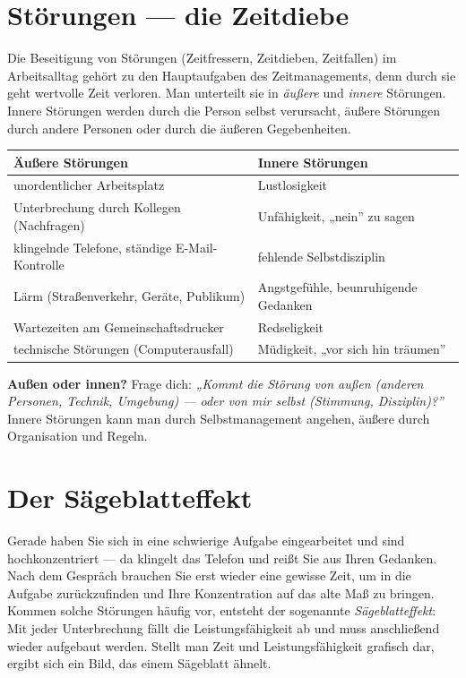 \documentclass[11pt, a4paper]{article}
\begin{document}
\section{Störungen --- die Zeitdiebe}

Die Beseitigung von Störungen (Zeitfressern, Zeitdieben, Zeitfallen) im Arbeitsalltag
gehört zu den Hauptaufgaben des Zeitmanagements, denn durch sie geht wertvolle Zeit
verloren. Man unterteilt sie in \emph{äußere} und \emph{innere} Störungen. Innere
Störungen werden durch die Person selbst verursacht, äußere Störungen durch andere
Personen oder durch die äußeren Gegebenheiten.

\begin{center}
\begin{tabular}{p{6.4cm} p{6.4cm}}
\toprule
\textbf{Äußere Störungen} & \textbf{Innere Störungen}\\
\midrule
unordentlicher Arbeitsplatz & Lustlosigkeit\\
Unterbrechung durch Kollegen (Nachfragen) & Unfähigkeit, „nein” zu sagen\\
klingelnde Telefone, ständige E-Mail-Kontrolle & fehlende Selbstdisziplin\\
Lärm (Straßenverkehr, Geräte, Publikum) & Angstgefühle, beunruhigende Gedanken\\
Wartezeiten am Gemeinschaftsdrucker & Redseligkeit\\
technische Störungen (Computerausfall) & Müdigkeit, „vor sich hin träumen”\\
\bottomrule
\end{tabular}
\end{center}

\begin{eselsbruecke}
\textbf{Außen oder innen?} Frage dich: \emph{„Kommt die Störung von außen (anderen
Personen, Technik, Umgebung) --- oder von mir selbst (Stimmung, Disziplin)?”} Innere
Störungen kann man durch Selbstmanagement angehen, äußere durch Organisation und Regeln.
\end{eselsbruecke}

\section{Der Sägeblatteffekt}

Gerade haben Sie sich in eine schwierige Aufgabe eingearbeitet und sind hochkonzentriert
--- da klingelt das Telefon und reißt Sie aus Ihren Gedanken. Nach dem Gespräch brauchen
Sie erst wieder eine gewisse Zeit, um in die Aufgabe zurückzufinden und Ihre
Konzentration auf das alte Maß zu bringen. Kommen solche Störungen häufig vor, entsteht
der sogenannte \emph{Sägeblatteffekt}: Mit jeder Unterbrechung fällt die
Leistungsfähigkeit ab und muss anschließend wieder aufgebaut werden. Stellt man Zeit und
Leistungsfähigkeit grafisch dar, ergibt sich ein Bild, das einem Sägeblatt ähnelt.
\end{document}
